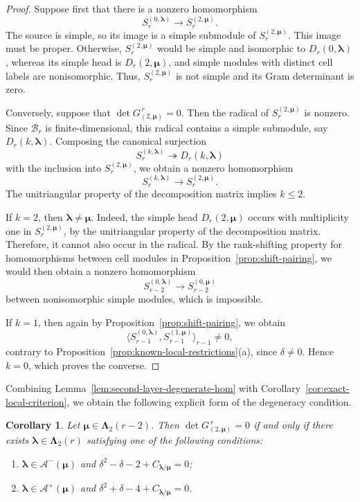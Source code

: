 \documentclass[10pt,a4paper]{amsart}
\newtheorem{corollary}[theorem]{Corollary}
\newcommand{\1}{\mathfrak{1}}
\newcommand{\B}{\mathcal{B}}
\begin{document}
\begin{proof}
Suppose first that there is a nonzero homomorphism
$$
S_r^{(0,\bm\lambda)}
\longrightarrow S_r^{(2,\bm\mu)}.
$$
The source is simple, so its image is a simple submodule
of $S_r^{(2,\bm\mu)}$.
This image must be proper.
Otherwise, $S_r^{(2,\bm\mu)}$ would be simple and
isomorphic to $D_r(0,\bm\lambda)$, whereas its simple
head is $D_r(2,\bm\mu)$, and simple modules with
distinct cell labels are nonisomorphic.
Thus, $S_r^{(2,\bm\mu)}$ is not simple and its Gram
determinant is zero.

Conversely, suppose that $\det G_{(2,\bm\mu)}^{\,r}=0$.
Then the radical of $S_r^{(2,\bm\mu)}$ is nonzero.
Since $\B_r$ is finite-dimensional, this radical contains
a simple submodule, say $D_r(k,\bm\lambda)$.
Composing the canonical surjection
$$
S_r^{(k,\bm\lambda)}
\twoheadrightarrow D_r(k,\bm\lambda)
$$
with the inclusion into $S_r^{(2,\bm\mu)}$,
we obtain a nonzero homomorphism
$$
S_r^{(k,\bm\lambda)}
\longrightarrow S_r^{(2,\bm\mu)}.
$$
The unitriangular property of the decomposition matrix implies
$k\leq2$.

If $k=2$, then $\bm\lambda\neq\bm\mu$.
Indeed, the simple head $D_r(2,\bm\mu)$ occurs with multiplicity one in $S_r^{(2,\bm\mu)}$, by the unitriangular property of the decomposition matrix. Therefore, it cannot also occur in the radical.
By the rank-shifting property for homomorphisms between cell modules in Proposition~\ref{prop:shift-pairing}, we would then obtain
a nonzero homomorphism
$$
S_{r-2}^{(0,\bm\lambda)}
\longrightarrow S_{r-2}^{(0,\bm\mu)}
$$
between nonisomorphic simple modules, which is impossible.

If $k=1$, then again by Proposition~\ref{prop:shift-pairing}, we obtain
$$
\langle
S_{r-1}^{(0,\bm\lambda)},S_{r-1}^{(1,\bm\mu)}
\rangle_{r-1}\neq0,
$$
contrary to Proposition~\ref{prop:known-local-restrictions}(a),
since $\delta\neq0$.
Hence $k=0$, which proves the converse.
\end{proof}

Combining Lemma~\ref{lem:second-layer-degenerate-hom} with Corollary~\ref{cor:exact-local-criterion}, we obtain the following explicit form of the degeneracy condition.

\begin{corollary}
\label{cor:second-layer-degeneracy}
Let $\bm\mu\in\bm\Lambda_2(r-2)$. Then
$\det G_{(2,\bm\mu)}^{\,r}=0$
if and only if there exists $\bm\lambda\in\bm\Lambda_2(r)$ satisfying one of the following conditions:
\begin{enumerate}
\item $\bm\lambda\in\mathcal A^-(\bm\mu)$ and $\delta^2-\delta-2+C_{\bm\lambda/\bm\mu}=0$;
\item $\bm\lambda\in\mathcal A^+(\bm\mu)$ and $\delta^2+\delta-4+C_{\bm\lambda/\bm\mu}=0$.
\end{enumerate}
\end{corollary}
\end{document}
